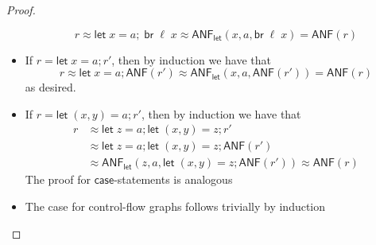 \documentclass[acmsmall,screen,review]{acmart}
\newcommand{\ms}[1]{\ensuremath{\mathsf{#1}}}
\newcommand{\letexpr}[3]{\ensuremath{\ms{let}\;#1 = #2;\;#3}}
\newcommand{\letstmt}[3]{\ensuremath{\ms{let}\;#1 = #2; #3}}
\newcommand{\brb}[2]{\ms{br}\;#1\;#2}
\newcommand{\teqv}{\approx}
\newcommand{\toanf}[1]{\ms{ANF}(#1)}
\newcommand{\letanf}[3]{\ms{ANF}_{\ms{let}}(#1, #2, #3)}
\begin{document}
\begin{proof}
\begin{itemize}
\begin{equation}
      r \teqv \letexpr{x}{a}{\brb{\ell}{x}} \teqv \letanf{x}{a}{\brb{\ell}{x}} = \toanf{r}
    \end{equation}
    \item If $r = \letstmt{x}{a}{r'}$, then by induction we have that
    \begin{equation}
      r \teqv \letstmt{x}{a}{\toanf{r'}} \teqv \letanf{x}{a}{\toanf{r'}} = \toanf{r}
    \end{equation}
    as desired.
    \item If $r = \letstmt{(x, y)}{a}{r'}$, then by induction we have that
    \begin{equation}
      \begin{aligned}
        r & \teqv \letstmt{z}{a}{\letstmt{(x, y)}{z}{r'}} \\
          & \teqv \letstmt{z}{a}{\letstmt{(x, y)}{z}{\ms{ANF}(r')}} \\
          & \teqv \letanf{z}{a}{\letstmt{(x, y)}{z}{\ms{ANF}(r')}}
            \teqv \toanf{r}
      \end{aligned}
    \end{equation}
    The proof for \ms{case}-statements is analogous
    \item The case for control-flow graphs follows trivially by induction
  \end{itemize}
\end{proof}

\label{proof:ssa-conversion}
\end{document}
